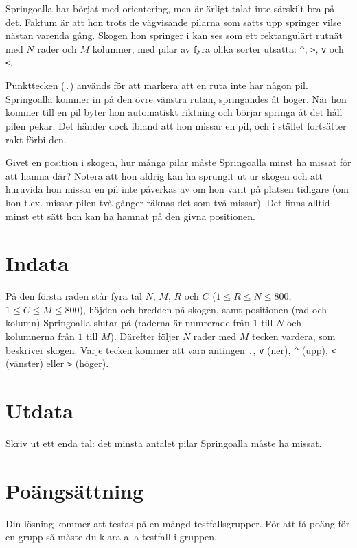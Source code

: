 Springoalla har börjat med orientering, men är ärligt talat inte
särskilt bra på det. Faktum är att hon trots de vägvisande pilarna
som satts upp springer vilse nästan varenda gång. Skogen hon springer
i kan ses som ett rektangulärt rutnät med $N$ rader och $M$ kolumner,
med pilar av fyra olika sorter utsatta: \verb+^+, \texttt{>},
\texttt{v} och \texttt{<}.

Punkttecken (\texttt{.}) används för att markera att en ruta inte har någon
pil. Springoalla
kommer in på den övre vänstra rutan, springandes åt höger. När hon
kommer till en pil byter hon automatiskt riktning och börjar springa
åt det håll pilen pekar. Det händer dock ibland att hon missar en
pil, och i stället fortsätter rakt förbi den.

Givet en position i skogen, hur många pilar måste Springoalla minst ha
missat för att hamna där? Notera att hon aldrig kan ha sprungit ut ur
skogen och att huruvida hon missar en pil inte påverkas av om hon varit
på platsen tidigare (om hon t.ex. missar pilen två gånger räknas det
som två missar). Det finns alltid minst ett sätt hon kan ha hamnat på den givna positionen.

\section*{Indata}

På den första raden står fyra tal $N$, $M$, $R$ och $C$ ($1 \leq R \leq N \leq 800$, $1 \leq C \leq M \leq 800$), höjden och bredden på skogen, samt positionen (rad och kolumn) Springoalla slutar
på (raderna är numrerade från $1$ till $N$ och kolumnerna från $1$ till
$M$). Därefter följer $N$ rader med $M$ tecken vardera, som beskriver skogen.
Varje tecken kommer att vara antingen \texttt{.}, \texttt{v} (ner),
\verb+^+ (upp), \texttt{<} (vänster) eller \texttt{>} (höger).

\section*{Utdata}
Skriv ut ett enda tal: det minsta antalet pilar Springoalla måste ha missat.

\section*{Poängsättning}
Din lösning kommer att testas på en mängd testfallsgrupper.
För att få poäng för en grupp så måste du klara alla testfall i gruppen.

